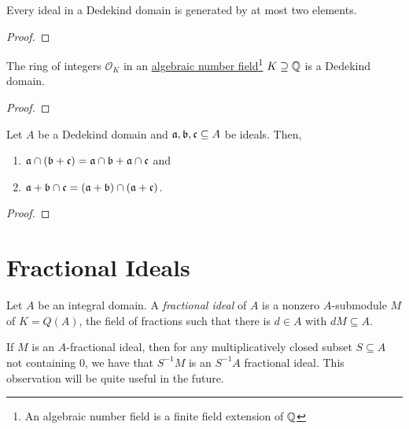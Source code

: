 \begin{corollary}
    Every ideal in a Dedekind domain is generated by at most two elements.
\end{corollary}
\begin{proof}
\end{proof}

\begin{theorem}
    The ring of integers $\mathcal{O}_K$ in an \underline{algebraic number field}\footnote{An algebraic number field is a finite field extension of $\mathbb{Q}$} $K\supseteq\mathbb{Q}$ is a Dedekind domain.
\end{theorem}
\begin{proof}
\end{proof}

\begin{proposition}
    Let $A$ be a Dedekind domain and $\mathfrak a,\mathfrak b,\mathfrak c\subseteq A$ be ideals. Then, 
    \begin{enumerate}[label=(\alph*)]
        \item $\mathfrak a\cap(\mathfrak b + \mathfrak c) = \mathfrak a\cap\mathfrak b + \mathfrak a\cap\mathfrak c$ and
        \item $\mathfrak a + \mathfrak b\cap\mathfrak c = (\mathfrak a + \mathfrak b)\cap(\mathfrak a + \mathfrak c)$.
    \end{enumerate}
\end{proposition}
\begin{proof}
    
\end{proof}

\section{Fractional Ideals}


\begin{definition}
    Let $A$ be an integral domain. A \emph{fractional ideal} of $A$ is a nonzero $A$-submodule $M$ of $K = Q(A)$, the field of fractions such that there is $d\in A$ with $dM\subseteq A$.
\end{definition}

\begin{remark}
    If $M$ is an $A$-fractional ideal, then for any multiplicatively closed subset $S\subseteq A$ not containing $0$, we have that $S^{-1}M$ is an $S^{-1}A$ fractional ideal. This observation will be quite useful in the future.
\end{remark}

